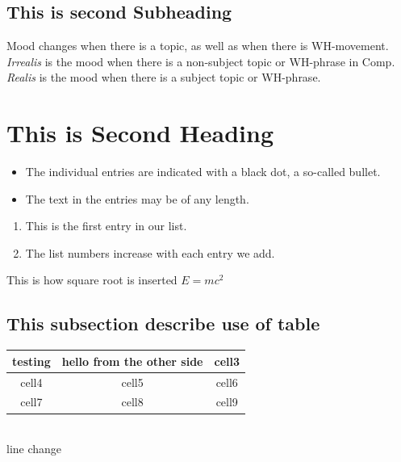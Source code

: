 \documentclass[12pt, A4]{article} %
\begin{document}
\subsection{This is second Subheading}

Mood changes when there is a topic, as well as when
there is WH-movement.  \emph{Irrealis} is the mood when
there is a non-subject topic or WH-phrase in Comp.
\emph{Realis} is the mood when there is a subject topic
or WH-phrase.

\newpage


\section{This is Second Heading}

\begin{itemize}
  \item The individual entries are indicated with a black dot, a so-called bullet.
  \item The text in the entries may be of any length. \\ %
\end{itemize}

\begin{enumerate}
  \item This is the first entry in our list.
  \item The list numbers increase with each entry we add. \\
\end{enumerate}

This is how square root is inserted $E=mc^2$ %

\subsection{This subsection describe use of table}

\begin{tabular}{|c| c| c|}
 \hline
 testing & hello from the other side & cell3 \\ 
 \hline 
 cell4 & cell5 & cell6\\  
 \hline 
 cell7 & cell8 & cell9 \\
 \hline    
\end{tabular} \\line change
\end{document}
